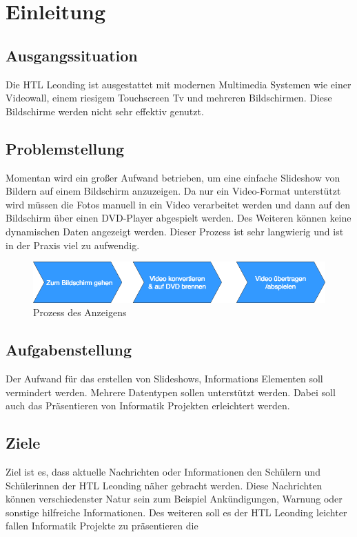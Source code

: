 \chapter{Einleitung}
\section{Ausgangssituation}
Die HTL Leonding ist ausgestattet mit modernen Multimedia Systemen wie einer Videowall, einem riesigem Touchscreen Tv und mehreren Bildschirmen. Diese Bildschirme werden nicht sehr effektiv genutzt.

\section{Problemstellung}
Momentan wird ein großer Aufwand betrieben, um eine einfache Slideshow von Bildern auf einem Bildschirm anzuzeigen. Da nur ein Video-Format unterstützt wird müssen die Fotos manuell in ein Video verarbeitet werden und dann auf den Bildschirm über einen DVD-Player abgespielt werden. Des Weiteren können keine dynamischen Daten angezeigt werden. Dieser Prozess ist sehr langwierig und ist in der Praxis viel zu aufwendig.

\begin{figure}[h]
\centering
\includegraphics[width=1\textwidth]{images/01_Introduction/WayToDisplay.png}
\caption{Prozess des Anzeigens}
\label{img:processofshow}
\end{figure}

\section{Aufgabenstellung}
Der Aufwand für das erstellen von Slideshows, Informations Elementen soll vermindert werden. Mehrere Datentypen sollen unterstützt werden. Dabei soll auch das Präsentieren von Informatik Projekten erleichtert werden.

\section{Ziele}
Ziel ist es, dass aktuelle Nachrichten oder Informationen den Schülern und Schülerinnen der HTL Leonding näher gebracht werden. Diese Nachrichten können verschiedenster Natur sein zum Beispiel Ankündigungen, Warnung oder sonstige hilfreiche Informationen. Des weiteren soll es der HTL Leonding leichter fallen Informatik Projekte zu präsentieren die 
